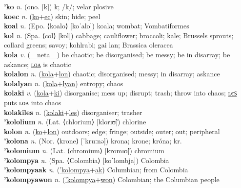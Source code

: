 \textbf{'ko} \textit{n.} (ono. [k])
k; /k/; velar plosive \label{'ko} \\
\textbf{koec} \textit{n.} (\hyperref[ko]{ko}+\hyperref[ec]{ec})
skin; hide; peel \label{koec} \\
\textbf{koal} \textit{n.} (Epo. ⟨koalo⟩ [koˈalo])
koala; wombat; Vombatiformes \label{koal} \\
\textbf{kol} \textit{n.} (Spa. ⟨col⟩ [kol])
cabbage; cauliflower; broccoli; kale; Brussels sprouts; collard greens; savoy; kohlrabi; gai lan; Brassica oleracea \label{kol} \\
\textbf{kola} \textit{v.} (\hyperref[neta]{~~neta~~})
be chaotic; be disorganised; be messy; be in disarray; be askance; \hyperref[kolalon]{ʟᴏᴧ} is chaotic \label{kola} \\
\textbf{kolalon} \textit{n.} (\hyperref[kola]{kola}+\hyperref[lon]{lon})
chaotic; disorganised; messy; in disarray; askance \label{kolalon} \\
\textbf{kolalyan} \textit{n.} (\hyperref[kola]{kola}+\hyperref[lyan]{lyan})
entropy; chaos \label{kolalyan} \\
\textbf{kolaki} \textit{v.} (\hyperref[kola]{kola}+\hyperref[ki]{ki})
disorganise; mess up; disrupt; trash; throw into chaos; \hyperref[kolakiles]{ʟєꜱ} puts ʟᴏᴧ into chaos \label{kolaki} \\
\textbf{kolakiles} \textit{n.} (\hyperref[kolaki]{kolaki}+\hyperref[les]{les})
disorganiser; trasher \label{kolakiles} \\
\textbf{'kololium} \textit{n.} (Lat. ⟨chlorium⟩ [klorɪʊ̃])
chlorine \label{'kololium} \\
\textbf{kolon} \textit{n.} (\hyperref[ko]{ko}+\hyperref[lon]{lon})
outdoors; edge; fringe; outside; outer; out; peripheral \label{kolon} \\
\textbf{'kolona} \textit{n.} (Nor. ⟨krone⟩ [ˈkruːnə])
krona; krone; króna; kr. \label{'kolona} \\
\textbf{'kolomium} \textit{n.} (Lat. ⟨chromium⟩ [kromɪʊ̃])
chromium \label{'kolomium} \\
\textbf{'kolompya} \textit{n.} (Spa. ⟨Colombia⟩ [koˈlombja])
Colombia \label{'kolompya} \\
\textbf{'kolompyaak} \textit{n.} (\hyperref['kolompya]{'kolompya}+\hyperref[ak]{ak})
Columbian; from Colombia \label{'kolompyaak} \\
\textbf{'kolompyawon} \textit{n.} (\hyperref['kolompya]{'kolompya}+\hyperref[won]{won})
Colombian; the Columbian people \label{'kolompyawon} \\
